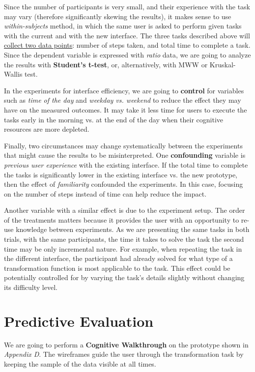 \documentclass[12pt,letterpaper]{article}
\begin{document}
\bigskip
Since the number of participants is very small, and their experience with the task may vary (therefore significantly skewing the results), it makes sense to use \textit{within-subjects} method, in which the same user is asked to perform given tasks with the current and with the new interface. The three tasks described above will \underline{collect two data points}: number of steps taken, and total time to complete a task. Since the dependent variable is expressed with \textit{ratio} data, we are going to analyze the results with \textbf{Student's t-test}, or, alternatively, with MWW or Kruskal-Wallis test. 

In the experiments for interface efficiency, we are going to \textbf{control} for variables such as \textit{time of the day} and \textit{weekday vs. weekend} to reduce the effect they may have on the measured outcomes. It may take it less time for users to execute the tasks early in the morning vs. at the end of the day when their cognitive resources are more depleted. 

Finally, two circumstances may change systematically between the experiments that might cause the results to be misinterpreted. One \textbf{confounding} variable is \textit{previous user experience} with the existing interface. If the total time to complete the tasks is significantly lower in the existing interface vs. the new prototype, then the effect of \textit{familiarity}  confounded the experiments. In this case, focusing on the number of steps instead of time can help reduce the impact.

Another variable with a similar effect is due to the experiment setup. The order of the treatments matters because it provides the user with an opportunity to re-use knowledge between experiments. As we are presenting the same tasks in both trials, with the same participants, the time it takes to solve the task the second time may be only incremental nature. For example, when repeating the task in the different interface, the participant had already solved for what type of a transformation function is most applicable to the task. This effect could be potentially controlled for by varying the task's details slightly without changing its difficulty level.


\section*{Predictive Evaluation}

We are going to perform a \textbf{Cognitive Walkthrough} on the prototype shown in \textit{Appendix D}. The wireframes guide the user through the transformation task by keeping the sample of the data visible at all times. 
\end{document}
